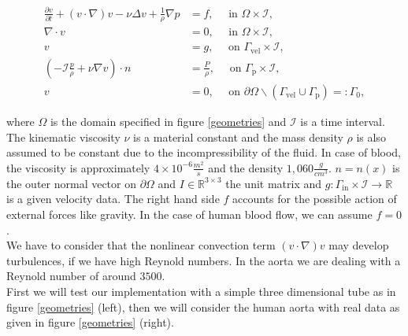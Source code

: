 \documentclass[a4paper, 11pt, twoside]{article}
\begin{document}
\begin{align}
\label{eq:NS_strong1}\tag{1a}
\frac{\partial v}{\partial t} + (v \cdot \nabla ) v -\nu \Delta v + \frac{1}{\rho} \nabla p &= f, \quad \text{ in } \Omega \times \mathcal {I},\\
\label{eq:NS_strong2}\tag{1b}
	 \nabla \cdot v &= 0, \quad \text{ in } \Omega\times \mathcal {I},\\
 \label{NR1}\tag{1c}
v &= g, \quad \text{ on } \Gamma_{\text{vel}} \times \mathcal {I},\\ 
\label{NR2}\tag{1d}
(- \mathcal{I} \frac{p}{\rho} + \nu \nabla v) \cdot n &= \frac{P}{\rho}, \quad \text{ on } \Gamma_{\text{p}} \times \mathcal {I},\\
 \label{NR3}\tag{1e}
 	v &= 0, \quad \text{ on } \partial\Omega \backslash (\Gamma_{\text{vel}} \cup \Gamma_{\text{p}})=:\Gamma_0,  
 \end{align}   

where $\Omega$ is the domain specified in figure \ref{geometries} and $\mathcal {I}$ is a time interval.
The kinematic viscosity $\nu$ is a material constant and the mass
density $\rho$ is also assumed to be constant due to the incompressibility of the fluid. In case of blood, the viscosity is approximately $4 \times 10^{-6} \frac{m^2}{s}$ and the density $1,060 \frac{g}{cm^3}$.
$n = n(x)$ is the outer normal vector on $ \partial \Omega$ and $ I \in \mathbb {R} ^ {3 \times 3} $ the unit matrix and $g:\Gamma_{\text{in}} \times \mathcal {I} \rightarrow \mathbb{R}$ is a given velocity data.
The right hand side $f$ accounts for the possible action of external forces like gravity.
In the case of human blood flow, we can assume $f = 0$.\\
We have to consider that the nonlinear convection term $(v\cdot  \nabla)v$ may develop turbulences, if we have high Reynold numbers.
In the aorta we are dealing with a Reynold number of around $3500$.\\

First we will test our implementation with a simple three dimensional tube as in figure \ref{geometries} (left), then we will consider the human aorta with real data as given in figure \ref{geometries} (right).
\end{document}
